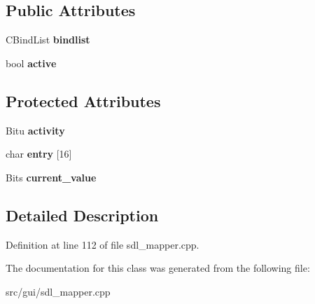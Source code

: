 \subsection*{Public Attributes}
\begin{DoxyCompactItemize}
\item 
\hypertarget{classCEvent_a0c900c0aab7bf38d7ac8769d5e4f6a5a}{C\-Bind\-List {\bfseries bindlist}}\label{classCEvent_a0c900c0aab7bf38d7ac8769d5e4f6a5a}

\item 
\hypertarget{classCEvent_af1e4934eb75e5636f81918c13983e2e3}{bool {\bfseries active}}\label{classCEvent_af1e4934eb75e5636f81918c13983e2e3}

\end{DoxyCompactItemize}
\subsection*{Protected Attributes}
\begin{DoxyCompactItemize}
\item 
\hypertarget{classCEvent_a487786e4e537594bf963e96aecae85cd}{Bitu {\bfseries activity}}\label{classCEvent_a487786e4e537594bf963e96aecae85cd}

\item 
\hypertarget{classCEvent_a20cca21cb3c606f3161a2757c1ba466d}{char {\bfseries entry} \mbox{[}16\mbox{]}}\label{classCEvent_a20cca21cb3c606f3161a2757c1ba466d}

\item 
\hypertarget{classCEvent_a7bbacdb8e3c5ee41ce13af19dc21db2d}{Bits {\bfseries current\-\_\-value}}\label{classCEvent_a7bbacdb8e3c5ee41ce13af19dc21db2d}

\end{DoxyCompactItemize}


\subsection{Detailed Description}


Definition at line 112 of file sdl\-\_\-mapper.\-cpp.



The documentation for this class was generated from the following file\-:\begin{DoxyCompactItemize}
\item 
src/gui/sdl\-\_\-mapper.\-cpp\end{DoxyCompactItemize}
